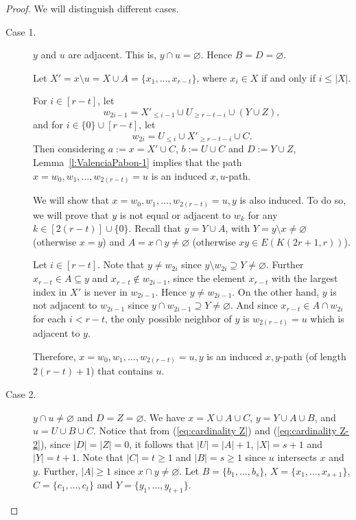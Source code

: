 \documentclass[a4paper,11pt]{article}
\renewcommand{\emptyset}{\varnothing}
\begin{document}
\begin{proof}
    
    We will distinguish different cases.
    \begin{description}
        \item[Case 1.] $y$ and $u$ are adjacent. This is, $y\cap u=\emptyset$. Hence $B=D=\emptyset$.
        
        Let $X'=x\setminus u=X\cup A=\{x_1,\ldots,x_{r-t}\}$, where $x_i\in X$ if and only if $i\leq |X|$.
        
        For $i \in [r-t]$, let
        $$w_{2i-1}=X'_{\leq i-1} \cup U_{\geq r-t-i} \cup (Y\cup Z),$$
        and for $i \in \{0\}\cup[r-t]$, let
        $$w_{2i}=U_{\leq i} \cup X'_{\geq r-t-i} \cup C.$$
        Then considering $a:=x=X'\cup C$, $b:=U\cup C$ and $D:=Y\cup Z$,  Lemma~\ref{l:ValenciaPabon-1}  implies that the path $x=w_0,w_1,\ldots,w_{2(r-t)}=u$ is an induced $x,u$-path.

        We will show that $x=w_0,w_1,\ldots,w_{2(r-t)}=u,y$ is also induced. To do so, we will prove that $y$ is not equal or adjacent to $w_k$ for any $k\in [2(r-t)] \cup \{0\}$. 
        Recall that $y=Y\cup A$, with $Y=y\setminus x\neq\emptyset$ (otherwise $x=y$) and $A=x\cap y\neq\emptyset$ (otherwise $xy \in E(K(2r+1,r))$).
        
        Let $i\in [r-t]$.
        Note that $y\neq w_{2i}$ since $y\setminus w_{2i}\supseteq Y\neq\emptyset$. Further $x_{r-t} \in A \subseteq y$ and $x_{r-t} \notin w_{2i-1}$, since the element $x_{r-t}$ with the largest index in $X'$ is never in $w_{2i-1}$. Hence $y\neq w_{2i-1}$. 
        On the other hand, $y$ is not adjacent to $w_{2i-1}$ since $y\cap w_{2i-1}\supseteq Y\neq\emptyset$. And since $x_{r-t}\in A\cap w_{2i}$ for each $i<r-t$, the only possible neighbor of $y$ is $w_{2(r-t)}=u$ which is adjacent to $y$.

        Therefore, $x=w_0,w_1,\ldots,w_{2(r-t)}=u,y$ is an induced $x,y$-path (of length $2(r-t)+1$) that contains $u$.
        
        
        \item[Case 2.] $y\cap u\neq \emptyset$ and $D=Z=\emptyset$. 
        We have $x=X\cup A\cup C$, $y=Y\cup A\cup B$, and $u=U\cup B\cup C$.       
        Notice that from (\ref{eq:cardinality Z}) and (\ref{eq:cardinality Z-2}), since $|D|=|Z|=0$, it follows that $|U|=|A|+1$, $|X|=s+1$ and $|Y|=t+1$. Note that $|C|=t\geq 1$ and $|B|=s\geq 1$ since $u$ intersects $x$ and $y$. Further, $|A|\geq 1$ since $x\cap y\neq \emptyset$.
        Let $B=\{b_1,\ldots,b_s\}$, $X=\{x_1,\ldots,x_{s+1}\}$, $C=\{c_1,\ldots,c_t\}$ and $Y=\{y_1,\ldots,y_{t+1}\}$.


\end{description}
\end{proof}
\end{document}
